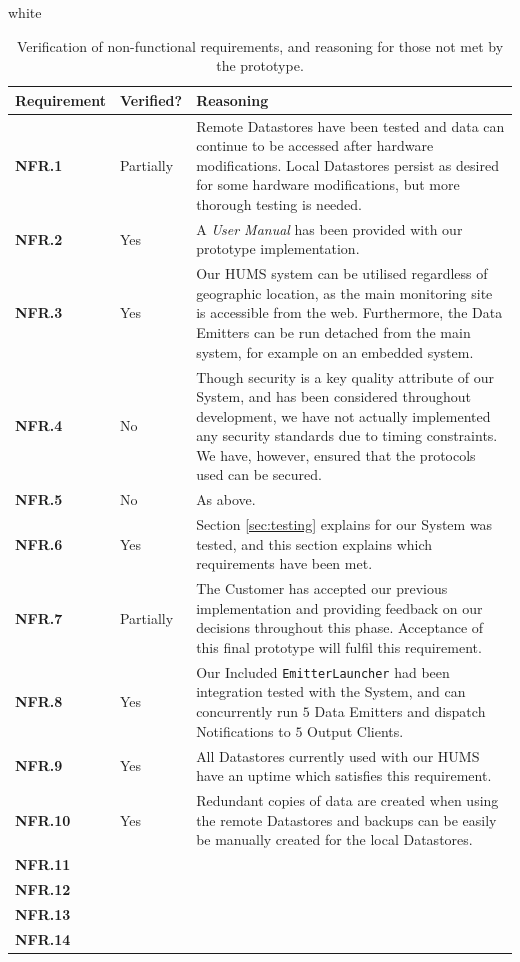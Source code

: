 \documentclass[10pt,a4paper]{article}
\newcommand{\tableformat}[4]{
\begin{table}[ht!]
\centering
  \rowcolors{2}{gray!10} {white}
\def\arraystretch{1.5}
\begin{tabularx}{\textwidth}{#1}
  \hline
  \rowcolor[gray]{0.9} #2
  \hline
\end{tabularx}
\caption{#3}
\label{#4}
\end{table}}
\newcommand{\nfr}[1]{\textcolor{reqColor}{\textbf{NFR.#1}}}
\begin{document}
\tableformat{ p{2cm}  p{2cm} X }{
Requirement & Verified? & Reasoning \\ \hline
\nfr{1} & Partially & Remote Datastores have been tested and data can continue to be accessed after hardware modifications. Local Datastores persist as desired for some hardware modifications, but more thorough testing is needed.\\
\nfr{2} & Yes & A \emph{User Manual} has been provided with our prototype implementation. \\
\nfr{3} & Yes & Our HUMS system can be utilised regardless of geographic location, as the main monitoring site is accessible from the web. Furthermore, the Data Emitters can be run detached from the main system, for example on an embedded system. \\
\nfr{4} & No & Though security is a key quality attribute of our System, and has been considered throughout development, we have not actually implemented any security standards due to timing constraints. We have, however, ensured that the protocols used can be secured.\\
\nfr{5} & No & As above.\\
\nfr{6} & Yes & Section \ref{sec:testing} explains for our System was tested, and this section explains which requirements have been met.\\
\nfr{7} & Partially & The Customer has accepted our previous implementation and providing feedback on our decisions throughout this phase. Acceptance of this final prototype will fulfil this requirement.\\
\nfr{8} & Yes & Our Included \texttt{EmitterLauncher} had been integration tested with the System, and can concurrently run $5$ Data Emitters and dispatch Notifications to $5$ Output Clients.\\
\nfr{9} & Yes & All Datastores currently used with our HUMS have an uptime which satisfies this requirement.\\
\nfr{10} & Yes & Redundant copies of data are created when using the remote Datastores and backups can be easily be manually created for the local Datastores. \\
\nfr{11} & & \\
\nfr{12} & & \\
\nfr{13} & & \\
\nfr{14} & & \\
}{Verification of non-functional requirements, and reasoning for those not met by the prototype.}{tab:nonfunctionalEval}

\end{document}
